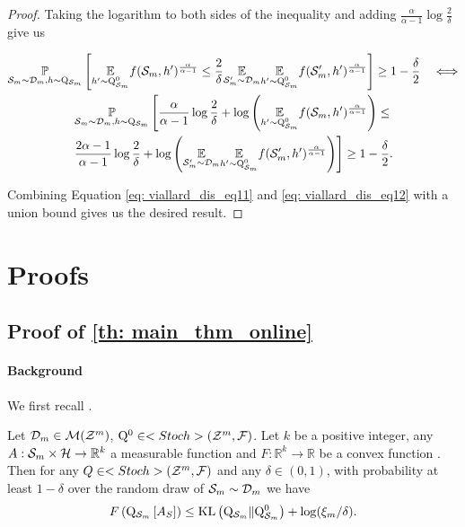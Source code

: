 \begin{noaddcontents}
\begin{proof}
Taking the logarithm to both sides of the inequality and adding $\frac{\alpha}{\alpha-1} \log \frac{2}{\delta}$ give us

\begin{multline}
\underset{\mathcal{S}_m \sim \mathcal{D}_{m}, h \sim \mathrm{Q}_{\mathcal{S}_m}}{\mathbb{P}}\left[\underset{h^{\prime} \sim \mathrm{Q}_{\mathcal{S}_m}^0}{\mathbb{E}} f(\mathcal{S}_m,h')^{\frac{\alpha}{\alpha-1}} \leq \frac{2}{\delta} \underset{\mathcal{S}_m^{\prime} \sim \mathcal{D}_{m}}{\mathbb{E}} \underset{h^{\prime} \sim \mathrm{Q}_{\mathcal{S}_m}^0}{\mathbb{E}} f(\mathcal{S}_m',h')^{\frac{\alpha}{\alpha-1}}\right] \geq 1-\frac{\delta}{2} \quad \Longleftrightarrow \\
\label{eq: viallard_dis_eq12}
\underset{\mathcal{S}_m \sim \mathcal{D}_{m}, h \sim \mathrm{Q}_{\mathcal{S}_m}}{\mathbb{P}}\left[\frac{\alpha}{\alpha-1} \log \frac{2}{\delta}+\log \left(\underset{h^{\prime} \sim \mathrm{Q}_{\mathcal{S}_m}^0}{\mathbb{E}} f(\mathcal{S}_m,h')^{\frac{\alpha}{\alpha-1}}\right) \leq \right. \\
 \left. \frac{2 \alpha-1}{\alpha-1} \log \frac{2}{\delta}+\log \left(\underset{\mathcal{S}_m^{\prime} \sim \mathcal{D}_{m}}{\mathbb{E}} \underset{h^{\prime} \sim \mathrm{Q}_{\mathcal{S}_m}^0}{\mathbb{E}} f(\mathcal{S}_m',h')^{\frac{\alpha}{\alpha-1}}\right)\right] \geq 1-\frac{\delta}{2} .
\end{multline}

Combining Equation \cref{eq: viallard_dis_eq11} and \cref{eq: viallard_dis_eq12} with a union bound gives us the desired result.
\end{proof}











\section{Proofs}
\label{sec: proofs-chap3}

\subsection{Proof of \cref{th: main_thm_online}}

\label{sec: proof_main_thm_online}




\paragraph{Background} We first recall \cite[Thm 2]{rivasplata2020pac}.

\begin{theorem}
\label{th: rivasplata2020}
Let $\mathcal{D}_{m} \in \mathcal{M}(\mathcal{Z}^m)$, $\mathrm{Q}^{0} \in <Stoch>(\mathcal{Z}^m,\mathcal{F})$. Let $k$ be a positive integer,  any  $A: \mathcal{S}_m \times \mathcal{H} \rightarrow \mathbb{R}^{k}$ a measurable function and $F: \mathbb{R}^{k} \rightarrow \mathbb{R}$ be a convex function .
Then for any $Q \in <Stoch>(\mathcal{Z}^m,\mathcal{F})$ and any $\delta \in(0,1)$, with probability at least $1-\delta$ over the random draw of $\mathcal{S}_m \sim \mathcal{D}_{m}$ we have
$$
F\left(\mathrm{Q}_{\mathcal{S}_m}\left[A_{S}\right]\right) \leq \mathrm{KL}\left(\mathrm{Q}_{\mathcal{S}_m} \| \mathrm{Q}_{\mathcal{S}_m}^{0}\right)+\log (\xi_m / \delta) .
$$


\end{theorem}
\end{noaddcontents}

